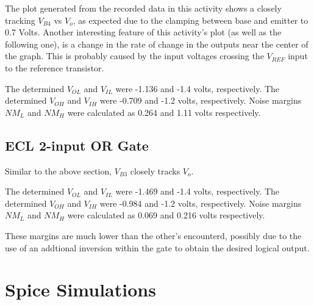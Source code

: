 \documentclass[10pt]{article}
\begin{document}
The plot generated from the recorded data in this activity shows a closely
tracking $V_{B4}$ vs $V_o$, as expected due to the clamping between base
and emitter to 0.7 Volts. Another interesting feature of this activity's
plot (as well as the following one), is a change in the rate of change in
the outputs near the center of the graph. This is probably caused by the
input voltages crossing the $V_{REF}$ input to the reference transistor.

The determined $V_{OL}$ and $V_{IL}$ were -1.136 and -1.4 volts,
respectively.  The determined $V_{OH}$ and $V_{IH}$ were -0.709 and -1.2
volts, respectively. Noise margins $NM_L$ and $NM_H$ were calculated as
0.264 and 1.11 volts respectively.

\subsection{ECL 2-input OR Gate}

Similar to the above section, $V_{B3}$ closely tracks $V_o$.

The determined $V_{OL}$ and $V_{IL}$ were -1.469 and -1.4 volts,
respectively.  The determined $V_{OH}$ and $V_{IH}$ were -0.984 and -1.2
volts, respectively. Noise margins $NM_L$ and $NM_H$ were calculated as
0.069 and 0.216 volts respectively.

These margins are much lower than the other's encounterd, possibly due to
the use of an addtional inversion within the gate to obtain the desired
logical output.

\section{Spice Simulations}

\end{document}
